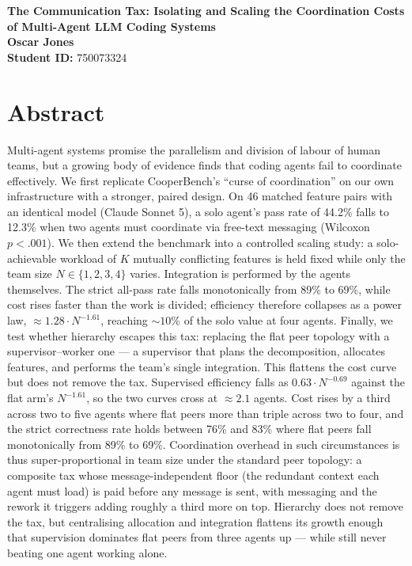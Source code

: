 \documentclass[11pt,a4paper]{article}
\begin{document}
\singlespacing  %
\thispagestyle{empty} %

\begin{center}
{\bf \LARGE The Communication Tax: Isolating and Scaling the Coordination Costs of Multi-Agent LLM Coding Systems}\\[0.5cm]
    \textbf{Oscar Jones} \\[0.2cm]
    \textbf{Student ID:} 750073324 \\[1cm]
\end{center}

\section*{Abstract}

\noindent
Multi-agent systems promise the parallelism and division of labour of human teams, but a growing body of evidence finds that coding agents fail to coordinate effectively. We first replicate CooperBench's ``curse of coordination'' on our own infrastructure with a stronger, paired design. On 46 matched feature pairs with an identical model (Claude Sonnet 5), a solo agent's pass rate of 44.2\% falls to 12.3\% when two agents must coordinate via free-text messaging (Wilcoxon $p < .001$). We then extend the benchmark into a controlled scaling study: a solo-achievable workload of $K$ mutually conflicting features is held fixed while only the team size $N \in \{1, 2, 3, 4\}$ varies. Integration is performed by the agents themselves. The strict all-pass rate falls monotonically from 89\% to 69\%, while cost rises faster than the work is divided; efficiency therefore collapses as a power law, $\approx 1.28 \cdot N^{-1.61}$, reaching ${\sim}10\%$ of the solo value at four agents. Finally, we test whether hierarchy escapes this tax: replacing the flat peer topology with a supervisor--worker one --- a supervisor that plans the decomposition, allocates features, and performs the team's single integration. This flattens the cost curve but does not remove the tax. Supervised efficiency falls as $0.63 \cdot N^{-0.69}$ against the flat arm's $N^{-1.61}$, so the two curves cross at ${\approx}2.1$ agents. Cost rises by a third across two to five agents where flat peers more than triple across two to four, and the strict correctness rate holds between 76\% and 83\% where flat peers fall monotonically from 89\% to 69\%. Coordination overhead in such circumstances is thus super-proportional in team size under the standard peer topology: a composite tax whose message-independent floor (the redundant context each agent must load) is paid before any message is sent, with messaging and the rework it triggers adding roughly a third more on top. Hierarchy does not remove the tax, but centralising allocation and integration flattens its growth enough that supervision dominates flat peers from three agents up --- while still never beating one agent working alone.
\end{document}
